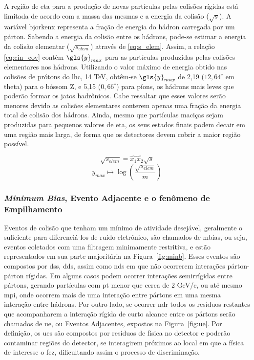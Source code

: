 A região de \gls{eta} para a produção de novas partículas pelas colisões
rígidas está limitada de acordo com a \gls{massa} das mesmas
e a energia da colisão ($\sqrt{s}$). A variável \gls{bjorkenx} representa a
fração de energia do hádron carregada por um párton. Sabendo a energia da colisão entre os
hádrons, pode-se estimar a energia da colisão elementar ($\sqrt{s_{elem}}$)
através de \ref{eq:s_elem}. Assim, a relação \ref{eq:cin_cov} contêm $\gls{y}_{max}$
para as partículas produzidas pelas colisões elementares nos hádrons.
Utilizando o valor máximo de energia obtido nas colisões de prótons do \gls{lhc}, 14 TeV, 
obtêm-se $\gls{y}_{max}$ de 2,19 ($12,64^{\circ}$ em \gls{theta}) para o bóssom Z, 
e 5,15 ($0,66^{\circ}$) para píons, os hádrons mais leves que poderão formar os
jatos hadrônicos. Cabe ressaltar que esses valores serão menores devido as
colisões elementares conterem apenas uma fração da energia total 
de colisão dos hádrons. Ainda, mesmo que partículas maciças sejam produzidas
para pequenos valores de \gls{eta}, os seus estados finais podem decair em uma
região mais larga, de forma que os detectores devem cobrir a maior região
possível.

\begin{equation}\label{eq:s_elem}
\sqrt{s_{elem}} = \hat{x_1} \hat{x_2} \sqrt{s}
\end{equation}
\begin{equation}\label{eq:cin_cov}
y_{max} \longmapsto \log\left( \frac{\sqrt{s_{elem}}}{m}\right)
\end{equation}



\subsubsection{\emph{Minimum Bias}, Evento Adjacente e o fenômeno de Empilhamento}
\label{sssec:minb_ue_pileup}

Eventos de colisão que tenham um mínimo de atividade desejável,
geralmente o suficiente para diferenciá-los de ruído eletrônico, 
são chamados de \gls{mbias}, ou
seja, eventos coletados com uma filtragem minimamente restritiva, e estão
representados em sua parte majoritária na Figura~\ref{fig:minb}. Esses
eventos são compostos por \glspl{ds}, \glspl{dd}, assim como \glspl{nd} em
que não ocorrerem interações párton-párton rígidas. Em alguns casos podem
ocorrer interações semirrígidas entre pártons, gerando partículas com \gls{pt}
menor que cerca de 2 GeV/c, ou até mesmo \gls{mpi}, onde ocorrem mais de uma
interação entre pártons em uma mesma interação entre hádrons. 
Por outro lado, se ocorrer \gls{ndr} 
todos os resíduos restantes que acompanharem a interação rígida de curto alcance
entre os pártons serão chamados de \gls{ue}, ou Eventos Adjacentes, expostos na
Figura~\ref{fig:ue}.
Por definição, os \glspl{ue} são compostos por resíduos de física no
detector e poderão contaminar regiões do detector, se interagirem próximos 
ao local em que a física de interesse o fez, dificultando assim o
processo de discriminação.

